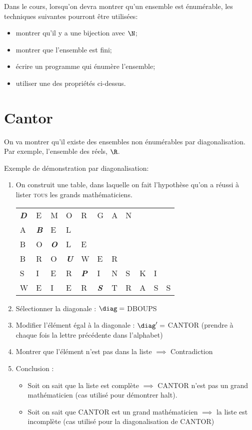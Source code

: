Dans le cours, lorsqu'on devra montrer qu'un ensemble est énumérable,
les techniques suivantes pourront être utilisées:
\begin{itemize}
	\item montrer qu'il y a une bijection avec $\N$;
	\item montrer que l'ensemble est fini;
	\item écrire un programme qui énumère l'ensemble;
	\item utiliser une des propriétés ci-dessus.
\end{itemize}


\section{Cantor}
\label{sec:cantor}
On va montrer qu'il existe des ensembles non énumérables par diagonalisation. Par exemple, l'ensemble des réels, $\R$.
\begin{myexem}
	Exemple de démonstration par diagonalisation:
	\begin{enumerate}
		\item On construit une table, dans laquelle on fait l'hypothèse qu'on a réussi à lister \textsc{tous} les grands mathématiciens.\\
			\begin{tabular}{lllllllllll}
				\emph{\textbf{D}}&E& M&O&R&G&A&N&&& \\
				A&\emph{\textbf{B}}&E&L&&&&&&&\\
				B&O&\emph{\textbf{O}}&L&E&&&&&&\\
				B&R&O&\emph{\textbf{U}}&W&E&R&&&&\\
				S&I&E&R&\emph{\textbf{P}}&I&N&S&K&I&\\
				W&E&I&E&R&\emph{\textbf{S}}&T&R&A&S&S\\
			\end{tabular}
		\item Sélectionner la diagonale : $\diag = $ DBOUPS
		\item Modifier l'élément égal à la diagonale : $\diag' =$ CANTOR (prendre à chaque fois la lettre précédente dans l'alphabet)
		\item Montrer que l'élément n'est pas dans la liste $\implies$ Contradiction
		\item Conclusion :
			\begin{itemize}
				\item Soit on sait que la liste est complète
					\subitem $ \implies$ CANTOR n'est pas un grand
					mathématicien (cas utilisé pour démontrer halt).
				\item Soit on sait que CANTOR est un grand
					mathématicien
					\subitem $ \implies$ la liste est incomplète (cas utilisé pour la diagonalisation de CANTOR)
			\end{itemize}
	\end{enumerate}
\end{myexem}

